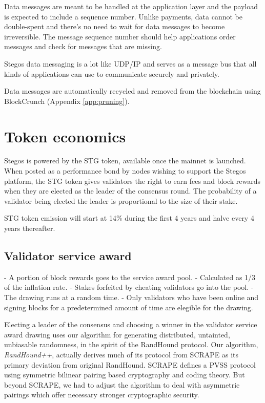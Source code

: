 \documentclass[8pt,fleqn,openany]{book}
\begin{document}
Data messages are meant to be handled at the application layer and the payload is expected to include a sequence number. Unlike payments, data cannot be double-spent and there's no need to wait for data messages to become irreversible. The message sequence number should help applications order messages and check for messages that are missing. 

Stegos data messaging is a lot like UDP/IP and serves as a message bus that all kinds of applications can use to communicate securely and privately.

Data messages are automatically recycled and removed from the blockchain using BlockCrunch (Appendix \ref{app:pruning}).

\section{Token economics}
Stegos is powered by the STG token, available once the mainnet is launched. When posted as a performance bond by nodes wishing to support the Stegos platform, the STG token gives validators the right to earn fees and block rewards when they are elected as the leader of the consensus round. The probability of a validator being elected the leader is proportional to the size of their stake.

STG token emission will start at 14\% during the first 4 years and halve every 4 years thereafter.

\subsection{Validator service award}\label{ValidatorAward}

- A portion of block rewards goes to the service award pool. 
- Calculated as 1/3 of the inflation rate.
- Stakes forfeited by cheating validators go into the pool.
- The drawing runs at a random time. 
- Only validators who have been online and signing blocks for a predetermined amount of time are elegible for the drawing.

Electing a leader of the consensus and choosing a winner in the validator service award drawing uses our algorithm for generating distributed, untainted, unbiasable randomness, in the spirit of the RandHound protocol\cite{c12}. Our algorithm, \textit{RandHound++}, actually derives much of its protocol from SCRAPE\cite{c13} as its primary deviation from original RandHound. SCRAPE defines a PVSS\cite{c14} protocol using symmetric bilinear pairing based cryptography and coding theory. But beyond SCRAPE, we had to adjust the algorithm to deal with asymmetric pairings which offer necessary stronger cryptographic security.
\end{document}
